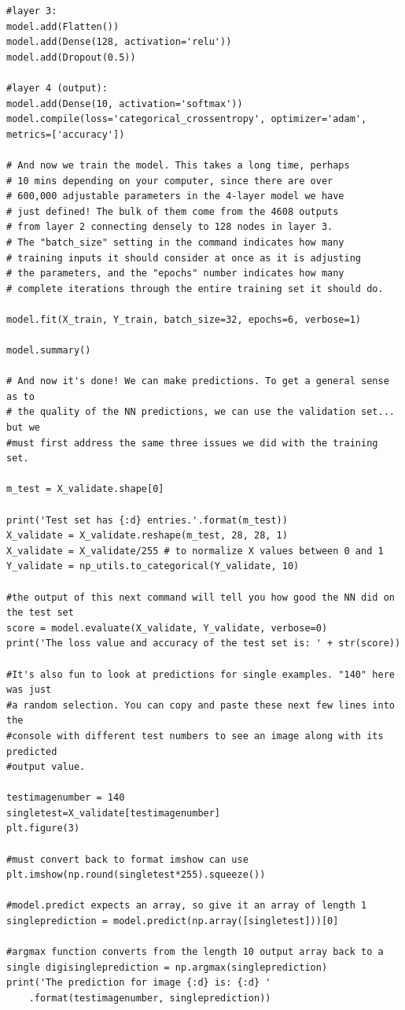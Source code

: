 \documentclass{book}
\theoremstyle{plain}
\theoremstyle{definition}
\numberwithin{exm}{chapter}
\theoremstyle{remark}
\theoremstyle{summary}
\theoremstyle{overview}
\begin{document}
\begin{lstlisting}
#layer 3:
model.add(Flatten())
model.add(Dense(128, activation='relu'))
model.add(Dropout(0.5))

#layer 4 (output):
model.add(Dense(10, activation='softmax'))
model.compile(loss='categorical_crossentropy', optimizer='adam',
metrics=['accuracy'])

# And now we train the model. This takes a long time, perhaps
# 10 mins depending on your computer, since there are over
# 600,000 adjustable parameters in the 4-layer model we have
# just defined! The bulk of them come from the 4608 outputs
# from layer 2 connecting densely to 128 nodes in layer 3.
# The "batch_size" setting in the command indicates how many
# training inputs it should consider at once as it is adjusting
# the parameters, and the "epochs" number indicates how many
# complete iterations through the entire training set it should do.

model.fit(X_train, Y_train, batch_size=32, epochs=6, verbose=1)

model.summary()

# And now it's done! We can make predictions. To get a general sense as to
# the quality of the NN predictions, we can use the validation set... but we
#must first address the same three issues we did with the training set.

m_test = X_validate.shape[0]

print('Test set has {:d} entries.'.format(m_test))
X_validate = X_validate.reshape(m_test, 28, 28, 1)
X_validate = X_validate/255 # to normalize X values between 0 and 1
Y_validate = np_utils.to_categorical(Y_validate, 10)

#the output of this next command will tell you how good the NN did on the test set
score = model.evaluate(X_validate, Y_validate, verbose=0)
print('The loss value and accuracy of the test set is: ' + str(score))

#It's also fun to look at predictions for single examples. "140" here was just
#a random selection. You can copy and paste these next few lines into the
#console with different test numbers to see an image along with its predicted
#output value.

testimagenumber = 140
singletest=X_validate[testimagenumber]
plt.figure(3)

#must convert back to format imshow can use
plt.imshow(np.round(singletest*255).squeeze())

#model.predict expects an array, so give it an array of length 1
singleprediction = model.predict(np.array([singletest]))[0]

#argmax function converts from the length 10 output array back to a single digisingleprediction = np.argmax(singleprediction)
print('The prediction for image {:d} is: {:d} '
	.format(testimagenumber, singleprediction))
\end{lstlisting}
\end{document}
